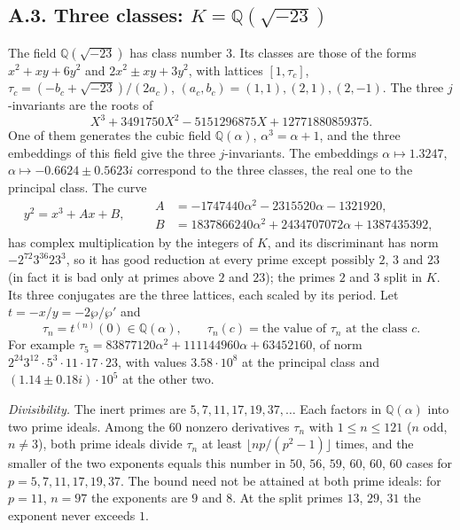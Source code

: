 \documentclass[11pt]{amsart}
\numberwithin{equation}{section}
\theoremstyle{definition}
\theoremstyle{remark}
\newcommand{\Q}{\mathbb Q}
\begin{document}
\subsection*{A.3. Three classes: $K=\Q(\sqrt{-23})$}
The field $\Q(\sqrt{-23})$ has class number $3$. Its classes are those of the forms $x^2+xy+6y^2$ and $2x^2\pm xy+3y^2$, with lattices $[1,\tau_c]$, $\tau_c=(-b_c+\sqrt{-23})/(2a_c)$, $(a_c,b_c)=(1,1),(2,1),(2,-1)$. The three $j$-invariants are the roots of
\begin{equation}\label{eq:exH23}
 X^3+3491750X^2-5151296875X+12771880859375 .
\end{equation}
One of them generates the cubic field $\Q(\alpha)$, $\alpha^3=\alpha+1$, and the three embeddings of this field give the three $j$-invariants. The embeddings $\alpha\mapsto1.3247$, $\alpha\mapsto-0.6624\pm0.5623i$ correspond to the three classes, the real one to the principal class. The curve
\begin{equation}\label{eq:excurve}
 y^2=x^3+Ax+B,\qquad\begin{aligned}A&=-1747440\alpha^2-2315520\alpha-1321920,\\ B&=1837866240\alpha^2+2434707072\alpha+1387435392,\end{aligned}
\end{equation}
has complex multiplication by the integers of $K$, and its discriminant has norm $-2^{72}3^{36}23^3$, so it has good reduction at every prime except possibly $2$, $3$ and $23$ (in fact it is bad only at primes above $2$ and $23$); the primes $2$ and $3$ split in $K$. Its three conjugates are the three lattices, each scaled by its period. Let $t=-x/y=-2\wp/\wp'$ and
\begin{equation}\label{eq:extau}
 \tau_n=t^{(n)}(0)\in\Q(\alpha),\qquad\tau_n(c)=\text{the value of }\tau_n\text{ at the class }c .
\end{equation}
For example $\tau_5=83877120\alpha^2+111144960\alpha+63452160$, of norm $2^{24}3^{12}\cdot5^3\cdot11\cdot17\cdot23$, with values $3.58\cdot10^8$ at the principal class and $(1.14\pm0.18i)\cdot10^5$ at the other two.

\emph{Divisibility.} The inert primes are $5,7,11,17,19,37,\dots$ Each factors in $\Q(\alpha)$ into two prime ideals. Among the $60$ nonzero derivatives $\tau_n$ with $1\le n\le121$ ($n$ odd, $n\ne3$), both prime ideals divide $\tau_n$ at least $\lfloor np/(p^2-1)\rfloor$ times, and the smaller of the two exponents equals this number in $50$, $56$, $59$, $60$, $60$, $60$ cases for $p=5,7,11,17,19,37$. The bound need not be attained at both prime ideals: for $p=11$, $n=97$ the exponents are $9$ and $8$. At the split primes $13$, $29$, $31$ the exponent never exceeds $1$.
\end{document}

